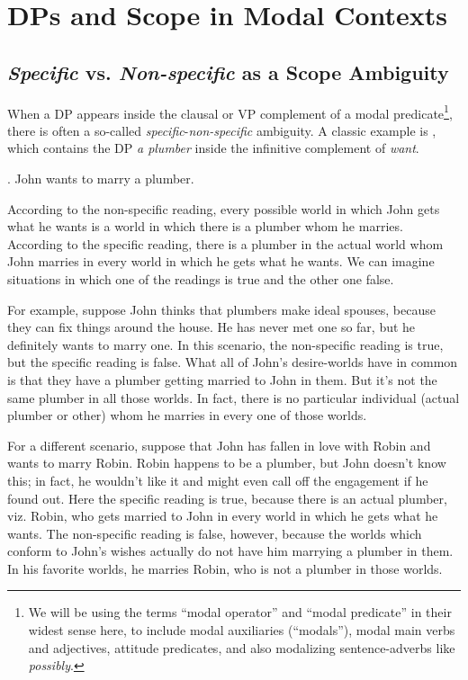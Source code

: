 

\chapter{DPs and Scope in Modal Contexts}


\minitoc

\section{\emph{Specific} vs. \emph{Non-specific} as a Scope Ambiguity}

When a DP appears inside the clausal or VP complement of a modal predicate\footnote{We will be using the terms ``modal operator'' and ``modal predicate'' in their widest sense here, to include modal auxiliaries (``modals''), modal main verbs and adjectives, attitude predicates, and also modalizing sentence-adverbs like \emph{possibly}. }, there is often a so-called \emph{specific}-\emph{non-specific} ambiguity. A classic example is \Next, which contains the DP \emph{a plumber} inside the infinitive complement of \emph{want}.

\ex. John wants to marry a plumber.

According to the non-specific reading, every possible world in which John gets what he wants is a world in which there is a plumber whom he marries. According to the specific reading, there is a plumber in the actual world whom John marries in every world in which he gets what he wants. We can imagine situations in which one of the readings is true and the other one false.

For example, suppose John thinks that plumbers make ideal spouses, because they can fix things around the house. He has never met one so far, but he definitely wants to marry one. In this scenario, the non-specific reading is true, but the specific reading is false. What all of John's desire-worlds have in common is that they have a plumber getting married to John in them. But it's not the same plumber in all those worlds. In fact, there is no particular individual (actual plumber or other) whom he marries in every one of those worlds.

For a different scenario, suppose that John has fallen in love with Robin and wants to marry Robin. Robin happens to be a plumber, but John doesn't know this; in fact, he wouldn't like it and might even call off the engagement if he found out. Here the specific reading is true, because there is an actual plumber, viz. Robin, who gets married to John in every world in which he gets what he wants. The non-specific reading is false, however, because the worlds which conform to John's wishes actually do not have him marrying a plumber in them. In his favorite worlds, he marries Robin, who is not a plumber in those worlds.

